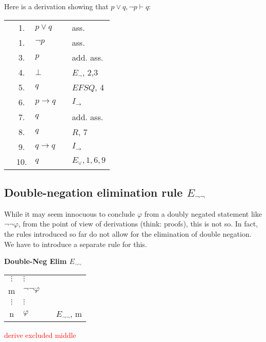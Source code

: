 \documentclass[nobib,nofonts]{tufte-handout}
\newcommand{\EFSQ}{\ensuremath{\mathit{EFSQ}}\xspace}
\begin{document}
Here is a derivation showing that $p \vee q, \neg p \vdash q$:

\begin{tabular}{cclcl}
                     & 1. & $p \vee   q$                        & & ass.  \\
                     & 1. & $\neg p$                            & & ass.  \\
  \cline{1-2} \vline & 3. & $p$                                 & & add. ass.  \\
  \vline             & 4. & $\bot$                              & & $E_{\neg}$, 2,3 \\
  \vline             & 5. & $q$                                 & & $\EFSQ$, 4\\ \hline
                     & 6. & $p \rightarrow q $ & & $I_{\rightarrow}$ \\
  \cline{1-2} \vline & 7. & $q$                                 & & add. ass.  \\
  \vline             & 8. & $q$                                 & & $R$, 7\\ \hline
                     & 9. & $q \rightarrow q $ & & $I_{\rightarrow}$ \\
                     & 10. & $q$ & & $E_{\vee}, 1,6,9$ \\
\end{tabular}


\subsection{Double-negation elimination rule $E_{\neg\neg}$}

While it may seem innocuous to conclude $\varphi$ from a doubly negated statement like $\neg\neg\varphi$, from the point of view of derivations (think: proofs), this is not so.
In fact, the rules introduced so far do not allow for the elimination of double negation.
We have to introduce a separate rule for this.

\bigskip
\noindent \colorbox{mygray!60}{\centering
  \begin{minipage}[t]{0.35\linewidth}
    \textbf{Double-Neg Elim $E_{\neg\neg}$}
  \end{minipage}
  \begin{minipage}[t]{0.55\linewidth}
    \begin{tabular}{clcl}
            $\vdots$ & $\vdots$  & \\
      m              & $\neg \neg \varphi$ &  \\
            $\vdots$ & $\vdots$  & \\
      n              & $\varphi$    & & $E_{\neg \neg}$, m
    \end{tabular}
  \end{minipage}
}
\bigskip

\textcolor{red}{derive excluded middle}
\end{document}
